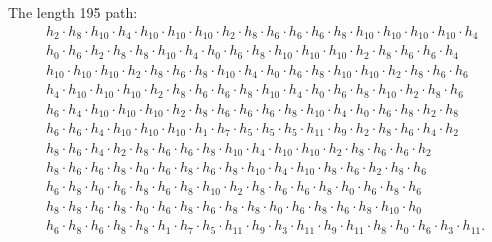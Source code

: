 The length 195 path:
\[
\begin{aligned}
	& h_{2} \cdot h_{8} \cdot h_{10} \cdot h_{4} \cdot h_{10} \cdot h_{10} \cdot h_{10} \cdot h_{2} \cdot h_{8} \cdot h_{6} \cdot h_{6} \cdot h_{6} \cdot h_{8} \cdot h_{10} \cdot h_{10} \cdot h_{10} \cdot h_{10} \cdot h_{4} \\ &
	h_{0} \cdot h_{6} \cdot h_{2} \cdot h_{8} \cdot h_{8} \cdot h_{10} \cdot h_{4} \cdot h_{0} \cdot h_{6} \cdot h_{8} \cdot h_{10} \cdot h_{10} \cdot h_{10} \cdot h_{2} \cdot h_{8} \cdot h_{6} \cdot h_{6} \cdot h_{4} \\ &
	h_{10} \cdot h_{10} \cdot h_{10} \cdot h_{2} \cdot h_{8} \cdot h_{6} \cdot h_{8} \cdot h_{10} \cdot h_{4} \cdot h_{0} \cdot h_{6} \cdot h_{8} \cdot h_{10} \cdot h_{10} \cdot h_{2} \cdot h_{8} \cdot h_{6} \cdot h_{6} \\ &
	h_{4} \cdot h_{10} \cdot h_{10} \cdot h_{10} \cdot h_{2} \cdot h_{8} \cdot h_{6} \cdot h_{6} \cdot h_{8} \cdot h_{10} \cdot h_{4} \cdot h_{0} \cdot h_{6} \cdot h_{8} \cdot h_{10} \cdot h_{2} \cdot h_{8} \cdot h_{6} \\ &
	h_{6} \cdot h_{4} \cdot h_{10} \cdot h_{10} \cdot h_{10} \cdot h_{2} \cdot h_{8} \cdot h_{6} \cdot h_{6} \cdot h_{6} \cdot h_{8} \cdot h_{10} \cdot h_{4} \cdot h_{0} \cdot h_{6} \cdot h_{8} \cdot h_{2} \cdot h_{8} \\ &
	h_{6} \cdot h_{6} \cdot h_{4} \cdot h_{10} \cdot h_{10} \cdot h_{10} \cdot h_{1} \cdot h_{7} \cdot h_{5} \cdot h_{5} \cdot h_{5} \cdot h_{11} \cdot h_{9} \cdot h_{2} \cdot h_{8} \cdot h_{6} \cdot h_{4} \cdot h_{2} \\ &
	h_{8} \cdot h_{6} \cdot h_{4} \cdot h_{2} \cdot h_{8} \cdot h_{6} \cdot h_{6} \cdot h_{8} \cdot h_{10} \cdot h_{4} \cdot h_{10} \cdot h_{10} \cdot h_{2} \cdot h_{8} \cdot h_{6} \cdot h_{6} \cdot h_{2} \\ &
	h_{8} \cdot h_{6} \cdot h_{6} \cdot h_{8} \cdot h_{0} \cdot h_{6} \cdot h_{8} \cdot h_{6} \cdot h_{8} \cdot h_{10} \cdot h_{4} \cdot h_{10} \cdot h_{8} \cdot h_{6} \cdot h_{2} \cdot h_{8} \cdot h_{6} \\ &
	h_{6} \cdot h_{8} \cdot h_{0} \cdot h_{6} \cdot h_{8} \cdot h_{6} \cdot h_{8} \cdot h_{10} \cdot h_{2} \cdot h_{8} \cdot h_{6} \cdot h_{6} \cdot h_{8} \cdot h_{0} \cdot h_{6} \cdot h_{8} \cdot h_{6} \\ &
	h_{8} \cdot h_{8} \cdot h_{6} \cdot h_{8} \cdot h_{0} \cdot h_{6} \cdot h_{8} \cdot h_{6} \cdot h_{8} \cdot h_{8} \cdot h_{0} \cdot h_{6} \cdot h_{8} \cdot h_{6} \cdot h_{8} \cdot h_{10} \cdot h_{0} \\ &
	h_{6} \cdot h_{8} \cdot h_{6} \cdot h_{8} \cdot h_{8} \cdot h_{1} \cdot h_{7} \cdot h_{5} \cdot h_{11} \cdot h_{9} \cdot h_{3} \cdot h_{11} \cdot h_{9} \cdot h_{11} \cdot h_{8} \cdot h_{0} \cdot h_{6} \cdot h_{3} \cdot h_{11}.
\end{aligned}
\]

